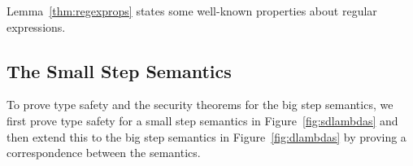 \documentclass[11pt,leqno]{article}
\newtheorem{trthm}[tr]{Theorem}
\newtheorem{trdef}[tr]{Definition}
\newtheorem{trconj}[tr]{Conjecture}
\newtheorem{lem}[thm]{Lemma}
\theoremstyle{definition}
\newcommand{\val}{{\sf val}}
\newcommand{\stringin}[1]{{\sf stringin}[#1]}
\newcommand{\lreplace}[3]{{\sf lreplace}(#1; #2; #3)}
\renewcommand{\lreplace}[3]{{\tt lreplace}(#1, #2, #3)}
\begin{document}
Lemma~\ref{thm:regexprops} states some well-known properties about regular expressions.

%
%
%

\subsection{The Small Step Semantics}

To prove type safety and the security theorems for the big step semantics, we
first prove type safety for a small step semantics in Figure~\ref{fig:sdlambdas}
and then extend this to the big step semantics in Figure~\ref{fig:dlambdas} by
proving a correspondence between the semantics.






\end{document}

